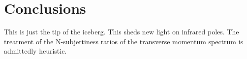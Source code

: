 \section{Conclusions}\label{sec:conclusions}

This is just the tip of the iceberg. This sheds new light on infrared
poles. The treatment of the N-subjettiness ratios of the transverse
momentum spectrum is admittedly heuristic.

